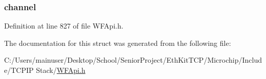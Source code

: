 \hypertarget{structt_w_f_connect_context_struct_a52d69a3bd7bdfdfc6f9e40f4962c575d}{}
\subsubsection[{channel}]{ channel}\label{structt_w_f_connect_context_struct_a52d69a3bd7bdfdfc6f9e40f4962c575d}


Definition at line 827 of file W\+F\+Api.\+h.



The documentation for this struct was generated from the following file\+:\begin{DoxyCompactItemize}
\item 
C\+:/\+Users/mainuser/\+Desktop/\+School/\+Senior\+Project/\+Eth\+Kit\+T\+C\+P/\+Microchip/\+Include/\+T\+C\+P\+I\+P Stack/\hyperlink{_w_f_api_8h}{W\+F\+Api.\+h}\end{DoxyCompactItemize}

